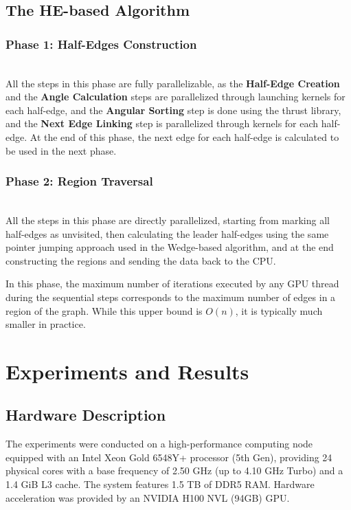 \documentclass[conference]{IEEEtran}
\begin{document}
\subsection{The HE-based Algorithm}

\subsubsection{Phase 1: Half-Edges Construction}\hfill\\
All the steps in this phase are fully parallelizable, as the \textbf{Half-Edge Creation} and the \textbf{Angle Calculation} steps are parallelized through launching kernels for each half-edge, and the \textbf{Angular Sorting} step is done using the thrust library, and the \textbf{Next Edge Linking} step is parallelized through kernels for each half-edge. At the end of this phase, the next edge for each half-edge is calculated to be used in the next phase.

\subsubsection{Phase 2: Region Traversal}\hfill\\
All the steps in this phase are directly parallelized, starting from marking all half-edges as unvisited, then calculating the leader half-edges using the same pointer jumping approach used in the Wedge-based algorithm, and at the end constructing the regions and sending the data back to the CPU.

In this phase, the maximum number of iterations executed by any GPU thread during the sequential steps corresponds to the maximum number of edges in a region of the graph. While this upper bound is \(O(n)\), it is typically much smaller in practice.

\section{Experiments and Results}

\subsection{Hardware Description}

The experiments were conducted on a high-performance computing node equipped with an Intel Xeon Gold 6548Y+ processor (5th Gen), providing 24 physical cores with a base frequency of 2.50 GHz (up to 4.10 GHz Turbo) and a 1.4 GiB L3 cache. The system features 1.5 TB of DDR5 RAM. Hardware acceleration was provided by an NVIDIA H100 NVL (94GB) GPU.
\end{document}
